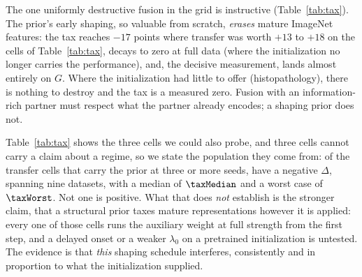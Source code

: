The one uniformly destructive fusion in the grid is instructive
(Table~\ref{tab:tax}). The prior's early shaping, so valuable from
scratch, \emph{erases} mature ImageNet features: the tax reaches
$-17$ points where transfer was worth $+13$ to $+18$ on the cells of
Table~\ref{tab:tax}, decays to zero at
full data (where the initialization no longer carries the performance),
and, the decisive measurement, lands almost entirely on $G$. Where
the initialization had little to offer (histopathology), there is nothing
to destroy and the tax is a measured zero. Fusion with an information-rich
partner must respect what the partner already encodes; a shaping prior
does not.

Table~\ref{tab:tax} shows the three cells we could also probe, and three cells
cannot carry a claim about a regime, so we state the population they come from:
of the \taxCells{} transfer cells that carry the prior at three or more seeds,
\taxNegative{} have a negative $\Delta$, spanning nine datasets, with a median
of $\taxMedian$ and a worst case of $\taxWorst$. Not one is positive. What that
does \emph{not} establish is the stronger claim, that a structural prior taxes
mature representations however it is applied: every one of those cells runs the
auxiliary weight at full strength from the first step, and a delayed onset or a
weaker $\lambda_0$ on a pretrained initialization is untested. The evidence is
that \emph{this} shaping schedule interferes, consistently and in proportion to
what the initialization supplied.

